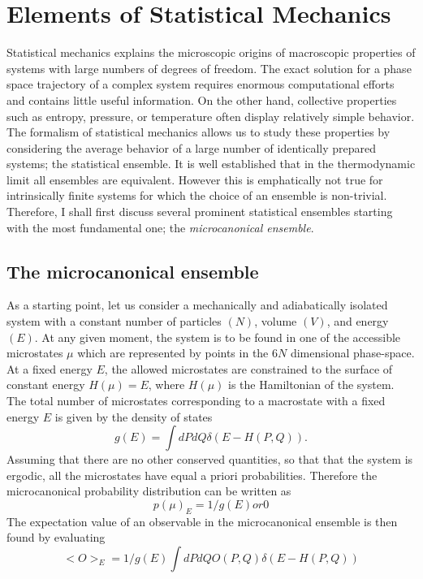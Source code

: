 \documentclass[12pt]{report}
\begin{document}
\chapter{Elements of Statistical Mechanics}
Statistical mechanics explains the microscopic origins of macroscopic properties of systems with large numbers of degrees of freedom. The exact solution for a phase space trajectory of a complex system requires enormous computational efforts and contains little useful information. On the other hand, collective properties such as entropy, pressure, or temperature often display relatively simple behavior. The formalism of statistical mechanics allows us to study these properties by considering the average behavior of a large number of identically prepared systems; the statistical ensemble. It is well established that in the thermodynamic limit all ensembles are equivalent. However this is emphatically not true for intrinsically finite systems for which the choice of an ensemble is non-trivial. Therefore, I shall first discuss several prominent statistical ensembles starting with the most fundamental one; the \textit{microcanonical ensemble}.

\section{The microcanonical ensemble}
As a starting point, let us consider a mechanically and adiabatically isolated system with a constant number of particles $(N)$, volume $(V)$, and energy $(E)$. At any given moment, the system is to be found in one of the accessible microstates $\mu$ which are represented by points in the $6N$ dimensional phase-space. At a fixed energy $E$, the allowed microstates are constrained to the surface of constant energy $H(\mu) = E$, where $H(\mu)$ is the Hamiltonian of the system. The total number of microstates corresponding to a macrostate with a fixed energy $E$ is given by the density of states
\begin{equation}
g(E) = \int dPdQ \delta(E - H(P,Q)).
\end{equation} 
Assuming that there are no other conserved quantities, so that that the system is ergodic, all the microstates have equal a priori probabilities. Therefore the microcanonical probability distribution can be written as 
\begin{equation}
p(\mu)_{E} = 1/g(E) or 0
\end{equation}
The expectation value of an observable in the microcanonical ensemble is then found by evaluating
\begin{equation}
<O>_{E} = 1/g(E)\int dPdQ  O(P,Q)\delta(E - H(P,Q))
\end{equation}
\end{document}
